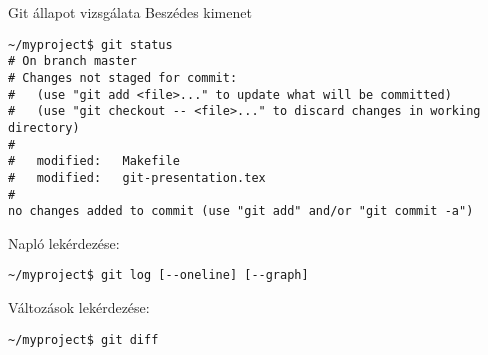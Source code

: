 
\begin{frame}[fragile]{Git állapot vizsgálata}
    Beszédes kimenet
    \tiny
\begin{verbatim}
~/myproject$ git status
# On branch master
# Changes not staged for commit:
#   (use "git add <file>..." to update what will be committed)
#   (use "git checkout -- <file>..." to discard changes in working directory)
#
#	modified:   Makefile
#	modified:   git-presentation.tex
#
no changes added to commit (use "git add" and/or "git commit -a")
\end{verbatim}

    Napló lekérdezése:
\begin{verbatim}
~/myproject$ git log [--oneline] [--graph]
\end{verbatim}

    Változások lekérdezése:
\begin{verbatim}
~/myproject$ git diff
\end{verbatim}
\end{frame}

